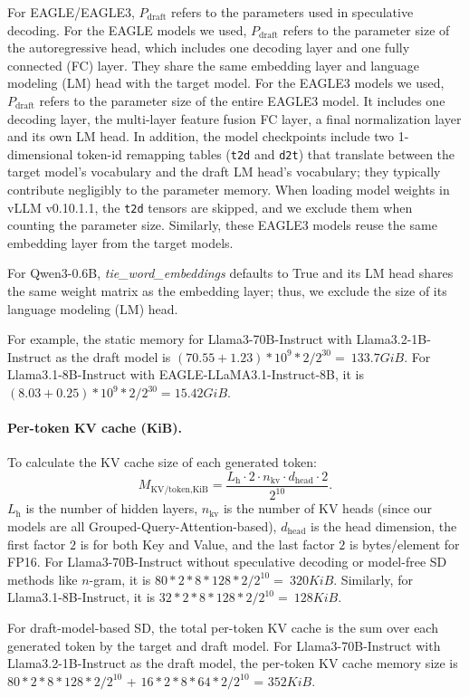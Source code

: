 \documentclass{article}
\begin{document}
For EAGLE/EAGLE3, $P_\text{draft}$ refers to the parameters used in speculative decoding. For the EAGLE models we used, $P_\text{draft}$ refers to the parameter size of the autoregressive head, which includes one decoding layer and one fully connected (FC) layer. They share the same embedding layer and language modeling (LM) head with the target model. For the EAGLE3 models we used, $P_\text{draft}$ refers to the parameter size of the entire EAGLE3 model. It includes one decoding layer, the multi-layer feature fusion FC layer, a final normalization layer and its own LM head. In addition, the model checkpoints include two 1-dimensional token-id remapping tables (\texttt{t2d} and \texttt{d2t}) that translate between the target model’s vocabulary and the draft LM head’s vocabulary; they typically contribute negligibly to the parameter memory. When loading model weights in vLLM v0.10.1.1, the \texttt{t2d} tensors are skipped, and we exclude them when counting the parameter size. Similarly, these EAGLE3 models reuse the same embedding layer from the target models.

For Qwen3-0.6B, \textit{tie\_word\_embeddings} defaults to True and its LM head shares the same weight matrix as the embedding layer; thus, we exclude the size of its language modeling (LM) head.

For example, the static memory for Llama3-70B-Instruct with Llama3.2-1B-Instruct as the draft model is $(70.55+1.23)*10^9*2/2^{30}=~133.7GiB$. For Llama3.1-8B-Instruct with EAGLE-LLaMA3.1-Instruct-8B, it is $(8.03+0.25)*10^9*2/2^{30}=15.42GiB$.

\paragraph{Per-token KV cache (KiB).}
To calculate the KV cache size of each generated token:
\[
M_\text{KV/token,KiB}=
\frac{L_\text{h}\cdot 2 \cdot n_\text{kv}\cdot d_\text{head}\cdot 2}{2^{10}} .
\]
$L_\text{h}$ is the number of hidden layers,
$n_\text{kv}$ is the number of KV heads (since our models are all Grouped-Query-Attention-based),
$d_\text{head}$ is the head dimension, the first factor $2$ is for both Key and Value, and the last factor $2$ is bytes/element for FP16. For Llama3-70B-Instruct without speculative decoding or model-free SD methods like $n$-gram, it is $80*2*8*128*2/2^{10}=~320KiB$. Similarly, for Llama3.1-8B-Instruct, it is $32*2*8*128*2/2^{10}=~128KiB$.

For draft-model-based SD, the total per-token KV cache is the sum over each generated token by the target and draft model. For Llama3-70B-Instruct with Llama3.2-1B-Instruct as the draft model, the per-token KV cache memory size is $80*2*8*128*2/2^{10}$ + $16*2*8*64*2/2^{10}$ = $352KiB$.
\end{document}
